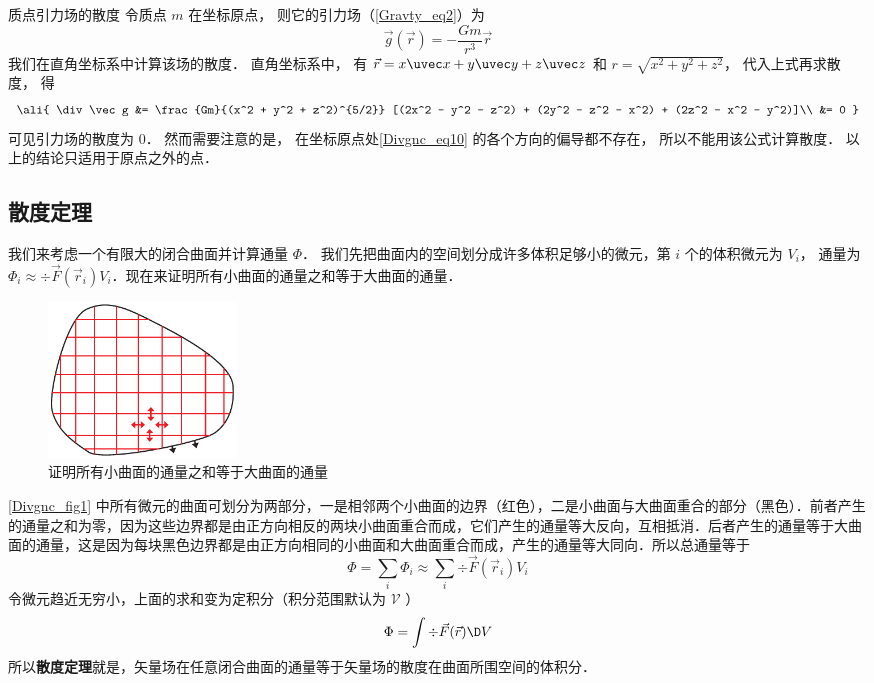 \begin{exam}{质点引力场的散度}
令质点 $m$ 在坐标原点， 则它的引力场（\autoref{Gravty_eq2}）为
\begin{equation}\label{Divgnc_eq10}
\vec g(\vec r) = -\frac{Gm}{r^3}\vec r
\end{equation}
我们在直角坐标系中计算该场的散度． 直角坐标系中， 有 $\vec r = x\uvec x + y\uvec y + z\uvec z$ 和 $r = \sqrt{x^2 + y^2 + z^2}$， 代入上式再求散度， 得
\begin{equation}\ali{
\div \vec g &= \frac{Gm}{(x^2 + y^2 + z^2)^{5/2}} [(2x^2 - y^2 - z^2) + (2y^2 - z^2 - x^2) + (2z^2 - x^2 - y^2)]\\
&= 0
}\end{equation}
可见引力场的散度为 0． 然而需要注意的是， 在坐标原点处\autoref{Divgnc_eq10} 的各个方向的偏导都不存在， 所以不能用该公式计算散度． 以上的结论只适用于原点之外的点．
\end{exam}


\subsection{散度定理}

我们来考虑一个有限大的闭合曲面并计算通量 $\Phi$． 我们先把曲面内的空间划分成许多体积足够小的微元，第 $i$ 个的体积微元为 $V_i$， 通量为 ${\Phi _i} \approx \div \vec F({\vec r_i}){V_i}$．现在来证明所有小曲面的通量之和等于大曲面的通量．
\begin{figure}[ht]
\centering
\includegraphics[width=5cm]{./figures/Divgnc.pdf}
\caption{证明所有小曲面的通量之和等于大曲面的通量} \label{Divgnc_fig1}
\end{figure}
\autoref{Divgnc_fig1} 中所有微元的曲面可划分为两部分，一是相邻两个小曲面的边界（红色），二是小曲面与大曲面重合的部分（黑色）．前者产生的通量之和为零，因为这些边界都是由正方向相反的两块小曲面重合而成，它们产生的通量等大反向，互相抵消．后者产生的通量等于大曲面的通量，这是因为每块黑色边界都是由正方向相同的小曲面和大曲面重合而成，产生的通量等大同向．所以总通量等于
\begin{equation}
\Phi  = \sum\limits_i {{\Phi _i}}  \approx \sum\limits_i {\div \vec F ({{\vec r}_i}){V_i}} 
\end{equation}
令微元趋近无穷小，上面的求和变为定积分（积分范围默认为 $\mathcal V$ ）
\begin{equation}
\Phi  = \int {\div \vec F(\vec r)\D V}
\end{equation}
所以\textbf{散度定理}就是，矢量场在任意闭合曲面的通量等于矢量场的散度在曲面所围空间的体积分．




